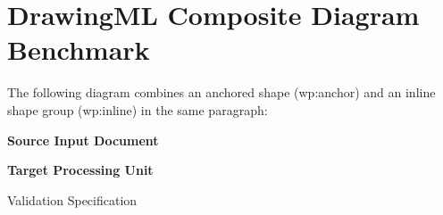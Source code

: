 \documentclass[11pt,a4paper]{article}
\begin{document}
\section{DrawingML Composite Diagram Benchmark}

The following diagram combines an anchored shape (wp:anchor) and an inline shape group (wp:inline) in the same paragraph:

\textbf{Source Input Document}

\textbf{Target Processing Unit}

Validation Specification

\begin{figure}[h]
\end{figure}
\end{document}
